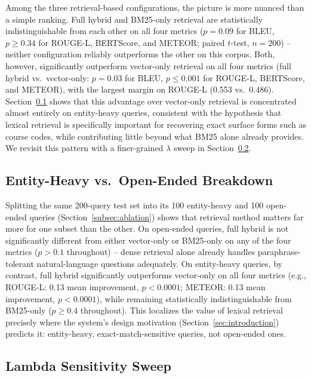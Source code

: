 \documentclass[a4paper,twoside]{article}
\begin{document}
Among the three retrieval-based configurations, the picture is more nuanced than a simple ranking. Full hybrid and BM25-only retrieval are statistically indistinguishable from each other on all four metrics ($p=0.09$ for BLEU, $p\geq0.34$ for ROUGE-L, BERTScore, and METEOR; paired $t$-test, $n=200$) -- neither configuration reliably outperforms the other on this corpus. Both, however, significantly outperform vector-only retrieval on all four metrics (full hybrid vs.\ vector-only: $p=0.03$ for BLEU, $p\leq0.001$ for ROUGE-L, BERTScore, and METEOR), with the largest margin on ROUGE-L (0.553 vs.\ 0.486). Section~\ref{subsec:entity-breakdown} shows that this advantage over vector-only retrieval is concentrated almost entirely on entity-heavy queries, consistent with the hypothesis that lexical retrieval is specifically important for recovering exact surface forms such as course codes, while contributing little beyond what BM25 alone already provides. We revisit this pattern with a finer-grained $\lambda$ sweep in Section~\ref{subsec:lambda-sweep}.

\subsection{Entity-Heavy vs.\ Open-Ended Breakdown}
\label{subsec:entity-breakdown}

Splitting the same 200-query test set into its 100 entity-heavy and 100 open-ended queries (Section~\ref{subsec:ablation}) shows that retrieval method matters far more for one subset than the other. On open-ended queries, full hybrid is not significantly different from either vector-only or BM25-only on any of the four metrics ($p>0.1$ throughout) -- dense retrieval alone already handles paraphrase-tolerant natural-language questions adequately. On entity-heavy queries, by contrast, full hybrid significantly outperforms vector-only on all four metrics (e.g., ROUGE-L: 0.13 mean improvement, $p<0.0001$; METEOR: 0.13 mean improvement, $p<0.0001$), while remaining statistically indistinguishable from BM25-only ($p\geq0.4$ throughout). This localizes the value of lexical retrieval precisely where the system's design motivation (Section~\ref{sec:introduction}) predicts it: entity-heavy, exact-match-sensitive queries, not open-ended ones.

\subsection{Lambda Sensitivity Sweep}
\label{subsec:lambda-sweep}
\end{document}
